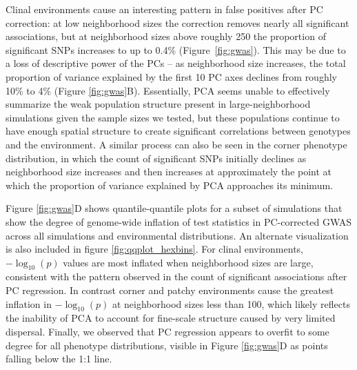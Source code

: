 \documentclass[10pt,twoside,lineno,hidelinks]{preprint}
\begin{document}
Clinal environments cause an interesting pattern in false positives after PC correction: at low neighborhood sizes the correction removes nearly all significant associations, 
but at neighborhood sizes above roughly 250 the proportion of significant SNPs increases to up to 0.4\% (Figure~\ref{fig:gwas}). 
This may be due to a loss of descriptive power of the PCs
-- as neighborhood size increases, the total proportion of variance explained by the first 10 PC axes declines from roughly 10\% to 4\% (Figure \ref{fig:gwas}B). 
Essentially, PCA seems unable to effectively summarize the weak population structure present in large-neighborhood simulations given the sample sizes we tested, 
but these populations continue to have enough spatial structure to create significant correlations between genotypes and the environment. A similar process can also be seen in the corner phenotype distribution, in which the count of significant SNPs initially declines as neighborhood size increases and then increases at approximately the point at which the proportion of variance explained by PCA approaches its minimum. 

Figure \ref{fig:gwas}D shows quantile-quantile plots for a subset of simulations that show the degree of genome-wide inflation of test statistics in PC-corrected GWAS across all simulations and environmental distributions. 
An alternate visualization is also included in figure \ref{fig:qqplot_hexbins}.
For clinal environments, $-\log_{10}(p)$ values are most inflated when neighborhood sizes are large, consistent with the pattern observed in the count of significant associations after PC regression. In contrast corner and patchy environments cause the greatest inflation in $-\log_{10}(p)$ at neighborhood sizes less than 100, which likely reflects the inability of PCA to account for fine-scale structure caused by very limited dispersal. Finally, we observed that PC regression appears to overfit to some degree for all phenotype distributions, visible in Figure \ref{fig:gwas}D as points falling below the 1:1 line.
\end{document}
